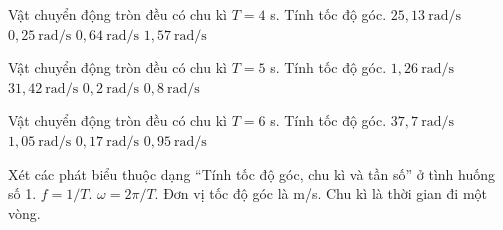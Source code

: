 \begin{ex}
Vật chuyển động tròn đều có chu kì $T=4$ s. Tính tốc độ góc.
\choice
{$25,13\ \mathrm{rad/s}$}
{$0,25\ \mathrm{rad/s}$}
{$0,64\ \mathrm{rad/s}$}
{\True $1,57\ \mathrm{rad/s}$}
\end{ex}

\begin{ex}
Vật chuyển động tròn đều có chu kì $T=5$ s. Tính tốc độ góc.
\choice
{\True $1,26\ \mathrm{rad/s}$}
{$31,42\ \mathrm{rad/s}$}
{$0,2\ \mathrm{rad/s}$}
{$0,8\ \mathrm{rad/s}$}
\end{ex}

\begin{ex}
Vật chuyển động tròn đều có chu kì $T=6$ s. Tính tốc độ góc.
\choice
{$37,7\ \mathrm{rad/s}$}
{\True $1,05\ \mathrm{rad/s}$}
{$0,17\ \mathrm{rad/s}$}
{$0,95\ \mathrm{rad/s}$}
\end{ex}

\begin{ex}
Xét các phát biểu thuộc dạng “Tính tốc độ góc, chu kì và tần số” ở tình huống số 1.
\choiceTF
{\True $f=1/T$.}
{\True $\omega=2\pi/T$.}
{Đơn vị tốc độ góc là m/s.}
{\True Chu kì là thời gian đi một vòng.}
\end{ex}

